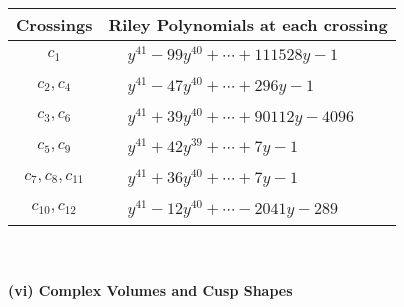 \documentclass[1p]{elsarticle_modified}
\theoremstyle{definition}
\begin{document}
\begin{tabular}{m{50pt}|m{274pt}}
Crossings & \hspace{64pt}Riley Polynomials at each crossing \\
\hline $$\begin{aligned}c_{1}\end{aligned}$$&$\begin{aligned}
&y^{41}-99 y^{40}+\cdots+111528 y-1
\end{aligned}$\\
\hline $$\begin{aligned}c_{2},c_{4}\end{aligned}$$&$\begin{aligned}
&y^{41}-47 y^{40}+\cdots+296 y-1
\end{aligned}$\\
\hline $$\begin{aligned}c_{3},c_{6}\end{aligned}$$&$\begin{aligned}
&y^{41}+39 y^{40}+\cdots+90112 y-4096
\end{aligned}$\\
\hline $$\begin{aligned}c_{5},c_{9}\end{aligned}$$&$\begin{aligned}
&y^{41}+42 y^{39}+\cdots+7 y-1
\end{aligned}$\\
\hline $$\begin{aligned}c_{7},c_{8},c_{11}\end{aligned}$$&$\begin{aligned}
&y^{41}+36 y^{40}+\cdots+7 y-1
\end{aligned}$\\
\hline $$\begin{aligned}c_{10},c_{12}\end{aligned}$$&$\begin{aligned}
&y^{41}-12 y^{40}+\cdots-2041 y-289
\end{aligned}$\\
\hline
\end{tabular}\\~\\
\newpage\flushleft \textbf{(vi) Complex Volumes and Cusp Shapes}
\end{document}
